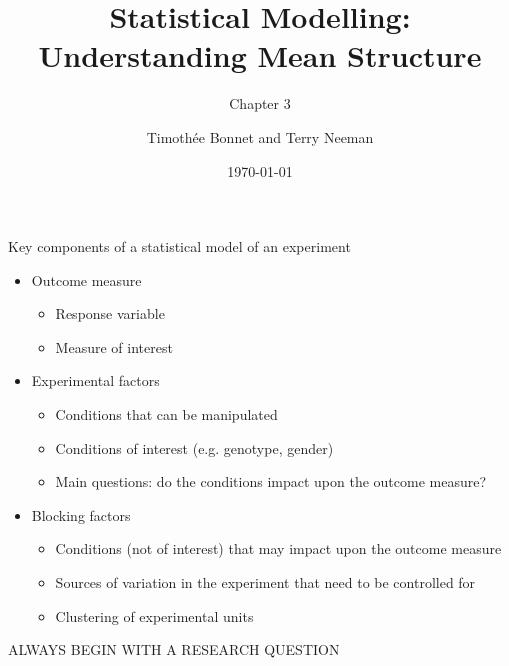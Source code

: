 \documentclass[10pt]{beamer}
\title{Statistical Modelling: Understanding Mean Structure}
\subtitle{Chapter 3}
\author{Timoth\'ee Bonnet and Terry Neeman}
\date{\today}
\begin{document}



\begin{frame}{}
\maketitle

\end{frame}


\begin{frame}{Key components of a statistical model of an experiment}
\begin{itemize}
  \item Outcome measure
  \begin{itemize}
   \item Response variable
   \item Measure of interest
  \end{itemize}
  \item Experimental factors 
  \begin{itemize}
   \item Conditions that can be manipulated 
   \item Conditions of interest (e.g. genotype, gender) 
   \item Main questions: do the conditions impact upon the outcome measure?
  \end{itemize}
  \item Blocking factors
  \begin{itemize}
   \item Conditions (not of interest) that may impact upon the outcome measure
   \item Sources of variation in the experiment that need to be controlled for
   \item Clustering of experimental units
  \end{itemize}
\end{itemize}

\vspace{0.2cm}
ALWAYS BEGIN WITH A RESEARCH QUESTION

\end{frame}
\end{document}
